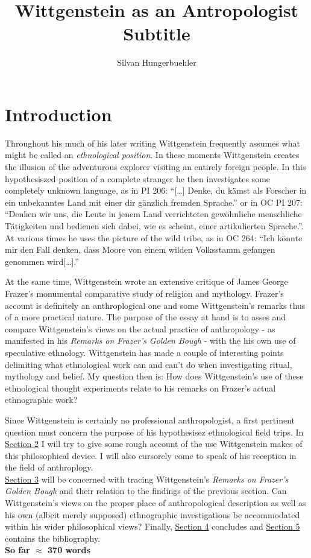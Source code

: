 \documentclass{article}
\title{Wittgenstein as an Antropologist\\
\large Subtitle}
\date{}
\author{Silvan Hungerbuehler}
\begin{document}
\maketitle
\section{Introduction}
Throughout his much of his later writing Wittgenstein frequently assumes what might be called an \textit{ethnological position}. In these moments Wittgenstein creates the illusion of the adventurous explorer visiting an entirely foreign people. In this hypothesiszed position of a complete stranger
he then investigates some completely unknown language, as in PI 206: “[…] Denke, du kämst als Forscher in ein unbekanntes Land mit einer dir gänzlich fremden Sprache.” or in OC PI 207: “Denken wir uns, die Leute in jenem Land verrichteten gewöhnliche menschliche Tätigkeiten und bedienen sich dabei, wie es scheint, einer artikulierten Sprache.”. At various times he uses the picture of the wild tribe, as in OC 264: “Ich könnte mir den Fall denken, dass Moore von einem wilden Volksstamm gefangen genommen wird[…].” 

At the same time, Wittgenstein wrote an extensive critique of James George Frazer's monumental comparative study of religion and mythology. Frazer's account is definitely an anthroplogical one and some Wittgenstein's remarks thus of a more practical nature. The purpose of the essay at hand is to asses and compare Wittgenstein's views on the actual practice of anthropology - as manifested in his \textit{Remarks on Frazer's Golden Bough} - with the his own use of speculative ethnology. Wittgenstein has made a couple of interesting points delimiting what ethnological work can and can’t do when investigating ritual, mythology and belief. My question then is: How does Wittgenstein’s use of these ethnological thought experiments relate to his remarks on Frazer’s actual ethnographic work?

Since Wittgenstein is certainly no professional anthropologist, a first pertinent question must concern the purpose of his hypothesisez ethnological field trips. In \hyperlink{sec2}{Section 2} I will try to give some rough account of the use Wittgenstein makes of this philosophical device. I will also cursorely come to speak of his reception in the field of anthroplogy. \\
\hyperlink{sec3}{Section 3} will be concerned with tracing Wittgenstein's \textit{Remarks on Frazer's Golden Bough} and their relation to the findings of the previous section. Can Wittgenstein’s views on the proper place of anthropological description as well as his own (albeit merely supposed) ethnographic investigations be accommodated within his wider philosophical views? Finally, \hyperlink{sec4}{Section 4} concludes and \hyperlink{sec4}{Section 5} contains the bibliography.\\
\textbf{So far $\approx$ 370 words} 
\end{document}

